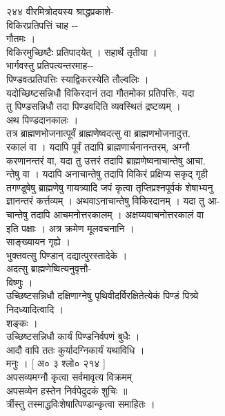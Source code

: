 \documentclass[11pt, openany]{book}
\begin{document}
{{{{{{{{{{{{{{{{{{{{{{{{{{{{{{{{{{{{{{{{{{{२४४ वीरमित्रोदयस्य श्राद्धप्रकाशे-}{\\
विकिरप्रतिपत्तिं चाह -\/-\\
गौतमः ।\\
विकिरमुच्छिष्टैः प्रतिपादयेत् }{। }{सहार्थे तृतीया ।\\
भार्गवस्तु प्रतिपत्यन्तरमाह-\/-\\
पिण्डवत्प्रतिपत्तिः स्याद्विकरस्येति तौल्वलिः ।\\
यदोच्छिष्टसन्निधौ विकिरदानं तदा गौतमोका प्रतिपत्तिः, यदा\\
तु पिण्डसन्निधौ तदा पिण्डवदिति व्यवस्थितं द्रष्टव्यम् ।\\
अथ पिण्डदानकालः ।\\
तत्र ब्राह्मणभोजनात्पूर्वं ब्राह्मणेष्वदत्सु वा ब्राह्मणभोजनादुत्त.\\
रकालं वा । यदापि पूर्वं तदापि ब्राह्मणार्चनानन्तरम्, अग्नौ\\
करणानन्तरं वा, यदा तु उत्तरं तदापि ब्राह्मणेष्वनाचान्तेषु आचा.\\
न्तेषु वा । यदापि अनाचान्तेषु तदापि विकिरं प्रक्षिप्य सकृद् गृही\\
तगण्डूषेषु ब्राह्मणेषु गायत्र्यादि जपं कृत्वा तृप्तिप्रश्नपूर्वकं
शेषाभ्यनु\\
ज्ञानन्तरं कर्त्तव्यम् । अथवाऽनाचान्तेषु विकिरदानम् । यदा तु आ-\\
चान्तेषु तदापि आचमनोत्तरकालम् }{।}{ अक्षय्यवाचनोत्तरकालं वा\\
इति पक्षाः । अत्र क्रमेण मूलवचनानि ।\\
साङ्ख्यायन गृह्ये }{।}{\\
भुक्तवत्सु पिण्डान् दद्यात्पुरस्तादेके ।\\
अदत्सु ब्राह्मणेष्वित्यनुवृत्तौ-\\
विष्णुः ।\\
उच्छिष्टसन्निधौ दक्षिणाग्नेषु पृथिवीदर्विरक्षितेत्येकं पिण्डं पित्र्ये\\
निदध्यादित्वादि ।\\
शङ्कः ।\\
उच्छिष्टसन्निधौ कार्यं पिण्डनिर्वपणं बुधैः ।\\
आदौ वापि ततः कुर्यादग्निकार्यं यथाविधि ।\\
मनुः । {[} अ० ३ श्लो० २१४ {]}\\
अपसव्यमग्नौ कृत्वा सर्वमावृत्य विक्रमम् \textbar{}\\
अपसव्येन हस्तेन निर्वपेदुदकं शुचिः ॥\\
र्त्रीस्तु तस्माद्धविःशेषात्पिण्डान्कृत्वा समाहितः ।\\
[ अ० ३ श्लो० २१५ ]

}}}}}}}}}}}}}}}}}}}}}}}}}}}}}}}}}}}}}}}}}}}
\end{document}
